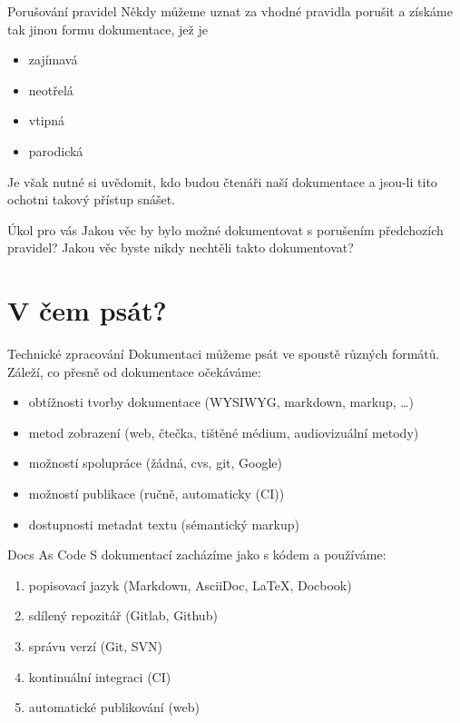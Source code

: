 \documentclass[12pt]{beamer}
\begin{document}
	\begin{frame}{Porušování pravidel}
	Někdy můžeme uznat za vhodné pravidla porušit a získáme tak jinou formu dokumentace, jež je
	\begin{itemize}
		\item zajímavá
		\item neotřelá
		\item vtipná
		\item parodická
	\end{itemize}
	Je však nutné si uvědomit, kdo budou čtenáři naší dokumentace a jsou-li tito ochotni takový přístup snášet.
	\end{frame}

	\begin{frame}{Úkol pro vás}
			Jakou věc by bylo možné dokumentovat s porušením předchozích pravidel? Jakou věc byste nikdy nechtěli takto dokumentovat?
	\end{frame}

	\section{V čem psát?}

	\begin{frame}{Technické zpracování}
	Dokumentaci můžeme psát ve spoustě různých formátů. Záleží, co přesně od dokumentace očekáváme:
	\begin{itemize}
		\item obtížnosti tvorby dokumentace (WYSIWYG, markdown, markup, \ldots{})
		\item metod zobrazení (web, čtečka, tištěné médium, audiovizuální metody)
		\item možností spolupráce (žádná, cvs, git, Google)
		\item možností publikace (ručně, automaticky (CI))
		\item dostupnosti metadat textu (sémantický markup)
	\end{itemize}

	\end{frame}

	  \begin{frame}{Docs As Code}
S dokumentací zacházíme jako s kódem a používáme:
\begin{enumerate}
	\item popisovací jazyk (Markdown, AsciiDoc, \LaTeX, Docbook)
	\item sdílený repozitář (Gitlab, Github)
	\item správu verzí (Git, SVN)
	\item kontinuální integraci (CI)
	\item automatické publikování (web)
\end{enumerate}
\end{frame}
\end{document}

